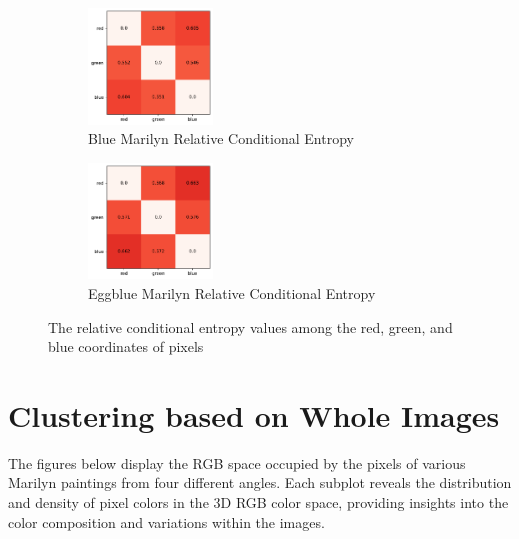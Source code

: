 \documentclass{article}
\begin{document}
\begin{figure}[ht]
  \begin{minipage}{0.6\textwidth}
    \centering
    \begin{subfigure}{0.45\textwidth}
      \centering
      \includegraphics[width=125px]{main_files/figure-latex/3_4_blue_marilyn_entropy.pdf}
      \caption{Blue Marilyn Relative Conditional Entropy}
      \label{fig:3_4_blue_marilyn_entropy}
    \end{subfigure}
    \hfill
    \begin{subfigure}{0.45\textwidth}
      \centering
      \includegraphics[width=125px]{main_files/figure-latex/3_5_eggblue_marilyn_entropy.pdf}
      \caption{Eggblue Marilyn Relative Conditional Entropy}
      \label{fig:3_5_eggblue_marilyn_entropy}
    \end{subfigure}
  \end{minipage}

  \caption{The relative conditional entropy values among the red, green, and blue coordinates of pixels}
  \label{fig:marilyn_entropy}
\end{figure}

\hypertarget{clustering-based-on-whole-images}{%
\section{Clustering based on Whole
Images}\label{clustering-based-on-whole-images}}

The figures below display the RGB space occupied by the pixels of
various Marilyn paintings from four different angles. Each subplot
reveals the distribution and density of pixel colors in the 3D RGB color
space, providing insights into the color composition and variations
within the images.
\end{document}
